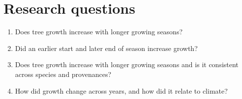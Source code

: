 \documentclass{article}\usepackage[]{graphicx}\usepackage[]{xcolor}
\begin{document}
\section*{Research questions}
\begin{enumerate}
\item Does tree growth increase with longer growing seasons?
\item Did an earlier start and later end of season increase growth? 
\item Does tree growth increase with longer growing seasons and is it consistent across species and provenances?
\item How did growth change across years, and how did it relate to climate?
\end{enumerate}

\end{document}
